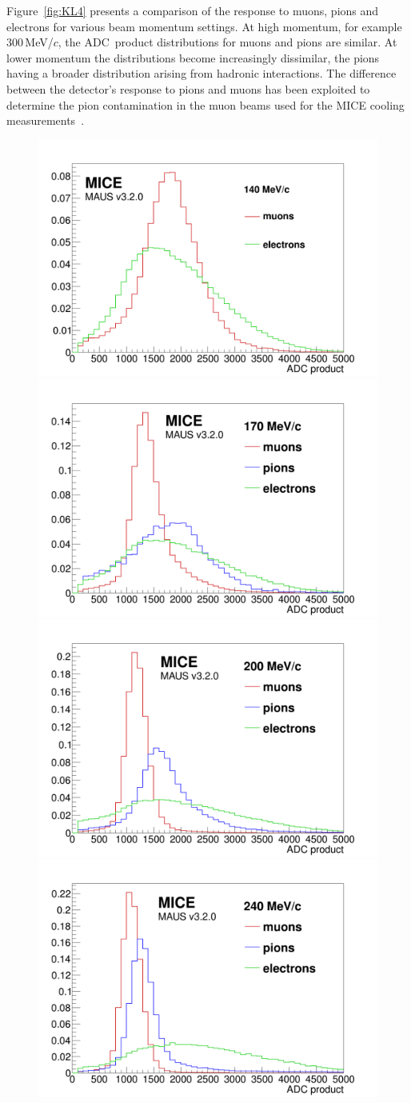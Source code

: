 Figure~\ref{fig:KL4} presents a comparison of the response to muons,
pions and electrons for various beam momentum settings.
At high momentum, for example 300\,MeV/$c$, the ADC~product
distributions for muons and pions are similar.
At lower momentum the distributions become increasingly dissimilar,
the pions having a broader distribution arising from hadronic
interactions.
The difference between the detector's response to pions and muons has
been exploited to determine the pion contamination in the muon beams
used for the MICE cooling measurements~\cite{2016JInst..11P3001A}.  
\begin{figure}
  \begin{center}
    \includegraphics[width=0.49\columnwidth]{./04-KL/Figures/mu_vs_e_140MeV.png}
    \includegraphics[width=0.49\columnwidth]{./04-KL/Figures/mu_vs_pi_vs_e_170MeV.png} 
    \includegraphics[width=0.49\columnwidth]{./04-KL/Figures/mu_vs_pi_vs_e_200MeV.png}
    \includegraphics[width=0.49\columnwidth]{./04-KL/Figures/mu_vs_pi_vs_e_240MeV.png}  	

\end{center}
\end{figure}
